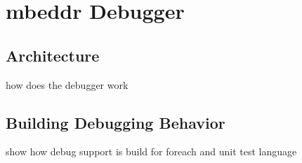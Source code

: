\section{mbeddr Debugger}

\subsection{Architecture}
how does the debugger work


\subsection{Building Debugging Behavior}
show how debug support is build for foreach and unit test language
